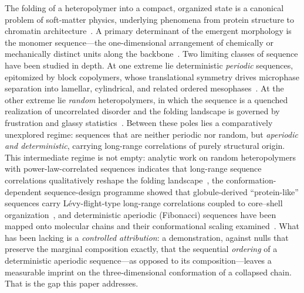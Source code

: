 \documentclass[11pt]{article}
\begin{document}
The folding of a heteropolymer into a compact, organized state is a canonical
problem of soft-matter physics, underlying phenomena from protein structure to
chromatin architecture~\cite{deGennes,LiebermanAiden}. A primary determinant of
the emergent morphology is the monomer sequence---the one-dimensional arrangement
of chemically or mechanically distinct units along the
backbone~\cite{Pande}. Two limiting classes of sequence have been studied in
depth. At one extreme lie deterministic \emph{periodic} sequences, epitomized by
block copolymers, whose translational symmetry drives microphase separation into
lamellar, cylindrical, and related ordered mesophases~\cite{Leibler,Bates}. At the
other extreme lie \emph{random} heteropolymers, in which the sequence is a quenched
realization of uncorrelated disorder and the folding landscape is governed by
frustration and glassy statistics~\cite{Bryngelson,Garel}. Between these poles lies
a comparatively unexplored regime: sequences that are neither periodic nor random,
but \emph{aperiodic and deterministic}, carrying long-range correlations of purely
structural origin. This intermediate regime is not empty: analytic work on random
heteropolymers with power-law-correlated sequences indicates that long-range sequence
correlations qualitatively reshape the folding landscape~\cite{Mamasakhlisov}, the
conformation-dependent sequence-design programme showed that globule-derived
``protein-like'' sequences carry L\'evy-flight-type long-range
correlations coupled to core--shell organization~\cite{KhokhlovKhalatur,Govorun},
and deterministic aperiodic (Fibonacci) sequences have been mapped onto molecular
chains and their conformational scaling examined~\cite{Azevedo}. What has been
lacking is a \emph{controlled attribution}: a demonstration, against nulls that
preserve the marginal composition exactly, that the sequential \emph{ordering} of a
deterministic aperiodic sequence---as opposed to its composition---leaves a
measurable imprint on the three-dimensional conformation of a collapsed chain. That
is the gap this paper addresses.
\end{document}
